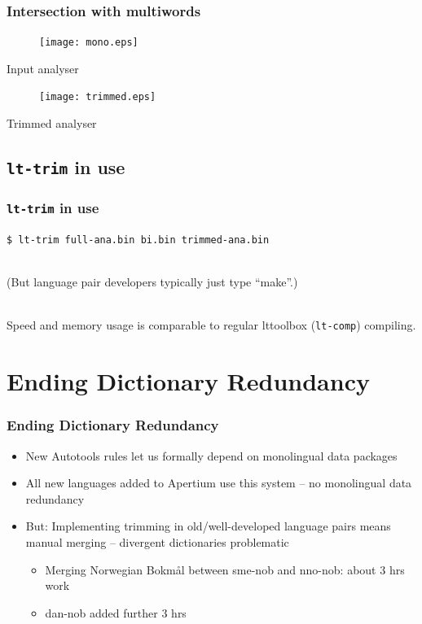 \documentclass[notes=hide]{beamer}
\newcommand{\tool}[1]{\texttt{#1}}
\begin{document}
\begin{frame}
  \frametitle{Intersection with multiwords}
  \begin{center}
    \begin{figure}[h]
      \texttt{[image: mono.eps]}
    \end{figure}
    \scriptsize{Input analyser}

    \begin{figure}[h]
      \texttt{[image: trimmed.eps]}
    \end{figure}
    \scriptsize{Trimmed analyser}
  \end{center}
\end{frame}

\subsection{\tool{lt-trim} in use}
\begin{frame}
  \frametitle{\tool{lt-trim} in use}
  \tool{\$ lt-trim full-ana.bin bi.bin trimmed-ana.bin}

  ~\\

  (But language pair developers typically just type ``make''.)

  ~\\

  Speed and memory usage is comparable to regular lttoolbox
  (\tool{lt-comp}) compiling.
\end{frame}

\section{Ending Dictionary Redundancy}
\begin{frame}
  \frametitle{Ending Dictionary Redundancy}
  \begin{itemize}
  \item New Autotools rules let us formally depend on monolingual data
    packages
  \item All new languages added to Apertium use this system – no
    monolingual data redundancy
  \item But: Implementing trimming in old/well-developed language
    pairs means manual merging – divergent dictionaries problematic
    \begin{itemize}
    \item Merging Norwegian Bokmål between sme-nob and nno-nob: about
      3 hrs work
    \item dan-nob added further 3 hrs
    \end{itemize}
  \end{itemize}
\end{frame}
\end{document}
